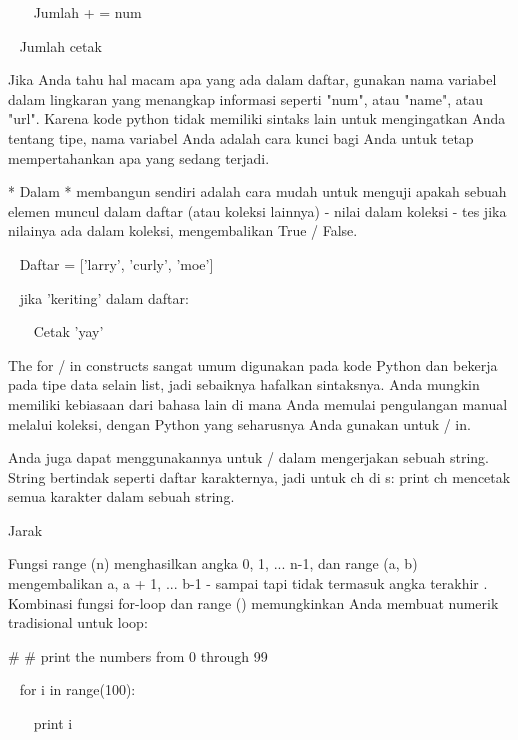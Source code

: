 ~~~ Jumlah + = num \par
~ Jumlah cetak \par
\vspace{12pt}
Jika Anda tahu hal macam apa yang ada dalam daftar, gunakan nama variabel dalam lingkaran yang menangkap informasi seperti "num", atau "name", atau "url". Karena kode python tidak memiliki sintaks lain untuk mengingatkan Anda tentang tipe, nama variabel Anda adalah cara kunci bagi Anda untuk tetap mempertahankan apa yang sedang terjadi. \par
\vspace{12pt}
* Dalam * membangun sendiri adalah cara mudah untuk menguji apakah sebuah elemen muncul dalam daftar (atau koleksi lainnya) - nilai dalam koleksi - tes jika nilainya ada dalam koleksi, mengembalikan True / False. \par
\vspace{12pt}
~ Daftar = ['larry', 'curly', 'moe'] \par
~ jika 'keriting' dalam daftar: \par
~~~ Cetak 'yay' \par
\vspace{12pt}
The for / in constructs sangat umum digunakan pada kode Python dan bekerja pada tipe data selain list, jadi sebaiknya hafalkan sintaksnya. Anda mungkin memiliki kebiasaan dari bahasa lain di mana Anda memulai pengulangan manual melalui koleksi, dengan Python yang seharusnya Anda gunakan untuk / in. \par
\vspace{12pt}
Anda juga dapat menggunakannya untuk / dalam mengerjakan sebuah string. String bertindak seperti daftar karakternya, jadi untuk ch di s: print ch mencetak semua karakter dalam sebuah string. \par
Jarak \par
\vspace{12pt}
Fungsi range (n) menghasilkan angka 0, 1, ... n-1, dan range (a, b) mengembalikan a, a + 1, ... b-1 - sampai tapi tidak termasuk angka terakhir . Kombinasi fungsi for-loop dan range () memungkinkan Anda membuat numerik tradisional untuk loop: \par
\vspace{12pt}
\vspace{12pt}
 $  \#  $ $  \#  $ print the numbers from 0 through 99 \par
~ for i in range(100): \par
~~~ print i \par
\vspace{12pt}
